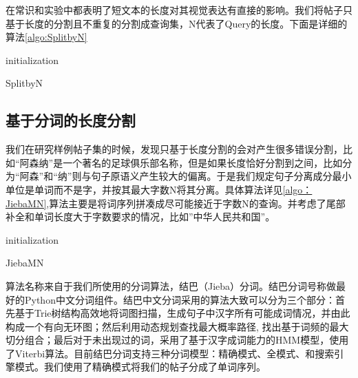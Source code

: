 在常识和实验中都表明了短文本的长度对其视觉表达有直接的影响。我们将帖子只基于长度的分割且不重复的分割成查询集，N代表了Query的长度。下面是详细的算法\ref{algo:SplitbyN}
\begin{algorithm}[htbp]
\SetAlgoLined
{}

initialization\;
\caption{SplitbyN}
\label{algo:SplitbyN}
\end{algorithm}
	
\subsection{基于分词的长度分割}
我们在研究样例帖子集的时候，发现只基于长度分割的会对产生很多错误分割，比如“阿森纳”是一个著名的足球俱乐部名称，但是如果长度恰好分割到之间，比如分为“阿森”和“纳”则与句子原语义产生较大的偏离。于是我们规定句子分离成分最小单位是单词而不是字，并按其最大字数N将其分离。具体算法详见\ref{algo：JiebaMN},算法主要是将词序列拼凑成尽可能接近于字数N的查询。并考虑了尾部补全和单词长度大于字数要求的情况，比如”中华人民共和国”。
\begin{algorithm}[htbp]
\SetAlgoLined
{}

initialization\;
\caption{JiebaMN}
\label{algo:JiebaMN}
\end{algorithm}

算法名称来自于我们所使用的分词算法，结巴（Jieba）分词。结巴分词号称做最好的Python中文分词组件。结巴中文分词采用的算法大致可以分为三个部分：首先基于Trie树结构高效地将词图扫描，生成句子中汉字所有可能成词情况，并由此构成一个有向无环图；然后利用动态规划查找最大概率路径, 找出基于词频的最大切分组合；最后对于未出现过的词，采用了基于汉字成词能力的HMM模型，使用了Viterbi算法。目前结巴分词支持三种分词模型：精确模式、全模式、和搜索引擎模式。我们使用了精确模式将我们的帖子分成了单词序列。

